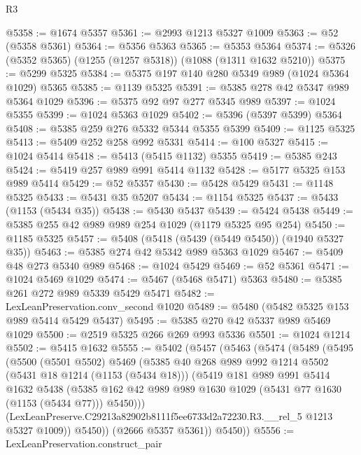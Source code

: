 \begin{lexlean}{R3}
\begin{coremodule}
@5358 := @1674 @5357
@5361 := @2993 @1213 @5327 @1009
@5363 := @52 (@5358 @5361)
@5364 := @5356 @5363
@5365 := @5353 @5364
@5374 := @5326 (@5352 @5365) (@1255 (@1257 @5318)) (@1088 (@1311 @1632 @5210))
@5375 := @5299 @5325
@5384 := @5375 @197 @140 @280 @5349 @989 (@1024 @5364 @1029) @5365
@5385 := @1139 @5325
@5391 := @5385 @278 @42 @5347 @989 @5364 @1029
@5396 := @5375 @92 @97 @277 @5345 @989
@5397 := @1024 @5355
@5399 := @1024 @5363 @1029
@5402 := @5396 (@5397 @5399) @5364
@5408 := @5385 @259 @276 @5332 @5344 @5355 @5399
@5409 := @1125 @5325
@5413 := @5409 @252 @258 @992 @5331
@5414 := @100 @5327
@5415 := @1024 @5414
@5418 := @5413 (@5415 @1132) @5355
@5419 := @5385 @243
@5424 := @5419 @257 @989 @991 @5414 @1132
@5428 := @5177 @5325 @153 @989 @5414
@5429 := @52 @5357
@5430 := @5428 @5429
@5431 := @1148 @5325
@5433 := @5431 @35 @5207
@5434 := @1154 @5325
@5437 := @5433 (@1153 (@5434 @35))
@5438 := @5430 @5437
@5439 := @5424 @5438
@5449 := @5385 @255 @42 @989 @989 @254 @1029 (@1179 @5325 @95 @254)
@5450 := @1185 @5325
@5457 := @5408 (@5418 (@5439 (@5449 @5450)) (@1940 @5327 @35))
@5463 := @5385 @274 @42 @5342 @989 @5363 @1029
@5467 := @5409 @48 @273 @5340 @989
@5468 := @1024 @5429
@5469 := @52 @5361
@5471 := @1024 @5469 @1029
@5474 := @5467 (@5468 @5471) @5363
@5480 := @5385 @261 @272 @989 @5339 @5429 @5471
@5482 := LexLeanPreservation.conv_second @1020
@5489 := @5480 (@5482 @5325 @153 @989 @5414 @5429 @5437)
@5495 := @5385 @270 @42 @5337 @989 @5469 @1029
@5500 := @2519 @5325 @266 @269 @993 @5336
@5501 := @1024 @1214
@5502 := @5415 @1632
@5555 := @5402
    (@5457
      (@5463
        (@5474
          (@5489
            (@5495
              (@5500
                (@5501 @5502)
                @5469
                (@5385
                  @40
                  @268
                  @989
                  @992
                  @1214
                  @5502
                  (@5431 @18 @1214 (@1153 (@5434 @18)))
                  (@5419
                    @181
                    @989
                    @991
                    @5414
                    @1632
                    @5438
                    (@5385
                      @162
                      @42
                      @989
                      @989
                      @1630
                      @1029
                      (@5431 @77 @1630 (@1153 (@5434 @77)))
                      @5450)))
                (LexLeanPreserve.C29213a82902b8111f5ee6733d2a72230.R3.__rel_5 @1213 @5327 @1009))
              @5450))
          (@2666 @5357 @5361))
        @5450))
@5556 := LexLeanPreservation.construct_pair

\end{coremodule}
\end{lexlean}
